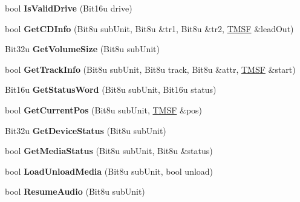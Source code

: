 \begin{DoxyCompactItemize}
\item 
\hypertarget{classCMscdex_ab2481121272d8f87ed90f64fdc398af4}{bool {\bfseries Is\-Valid\-Drive} (Bit16u drive)}\label{classCMscdex_ab2481121272d8f87ed90f64fdc398af4}

\item 
\hypertarget{classCMscdex_ade59cf8040558852abb1dfbcec7189ad}{bool {\bfseries Get\-C\-D\-Info} (Bit8u sub\-Unit, Bit8u \&tr1, Bit8u \&tr2, \hyperlink{structSMSF}{T\-M\-S\-F} \&lead\-Out)}\label{classCMscdex_ade59cf8040558852abb1dfbcec7189ad}

\item 
\hypertarget{classCMscdex_a46265444d991ab7a43d8e1483b2fb600}{Bit32u {\bfseries Get\-Volume\-Size} (Bit8u sub\-Unit)}\label{classCMscdex_a46265444d991ab7a43d8e1483b2fb600}

\item 
\hypertarget{classCMscdex_ac484559d3ff51a0fc0ee0cf7df99c899}{bool {\bfseries Get\-Track\-Info} (Bit8u sub\-Unit, Bit8u track, Bit8u \&attr, \hyperlink{structSMSF}{T\-M\-S\-F} \&start)}\label{classCMscdex_ac484559d3ff51a0fc0ee0cf7df99c899}

\item 
\hypertarget{classCMscdex_a438afa22d295857d059828f6002ea2a2}{Bit16u {\bfseries Get\-Status\-Word} (Bit8u sub\-Unit, Bit16u status)}\label{classCMscdex_a438afa22d295857d059828f6002ea2a2}

\item 
\hypertarget{classCMscdex_a1be2e43a7cafc6fbf1f06a6dda72daec}{bool {\bfseries Get\-Current\-Pos} (Bit8u sub\-Unit, \hyperlink{structSMSF}{T\-M\-S\-F} \&pos)}\label{classCMscdex_a1be2e43a7cafc6fbf1f06a6dda72daec}

\item 
\hypertarget{classCMscdex_a2aa20d1b23551d9bf9e6b84a456a53dc}{Bit32u {\bfseries Get\-Device\-Status} (Bit8u sub\-Unit)}\label{classCMscdex_a2aa20d1b23551d9bf9e6b84a456a53dc}

\item 
\hypertarget{classCMscdex_a1367a3db25fb8dba65a59dd879409de5}{bool {\bfseries Get\-Media\-Status} (Bit8u sub\-Unit, Bit8u \&status)}\label{classCMscdex_a1367a3db25fb8dba65a59dd879409de5}

\item 
\hypertarget{classCMscdex_ab54c0b2f0cfc504fb70dc820d35404e2}{bool {\bfseries Load\-Unload\-Media} (Bit8u sub\-Unit, bool unload)}\label{classCMscdex_ab54c0b2f0cfc504fb70dc820d35404e2}

\item 
\hypertarget{classCMscdex_a2ccb8c103a5755b4594698dd155fd6d4}{bool {\bfseries Resume\-Audio} (Bit8u sub\-Unit)}\label{classCMscdex_a2ccb8c103a5755b4594698dd155fd6d4}


\end{DoxyCompactItemize}
